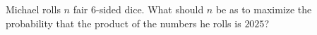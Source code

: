 Michael rolls $n$ fair $6$-sided dice. What should $n$ be as to maximize the probability that the product of the numbers he rolls is $2025$?

